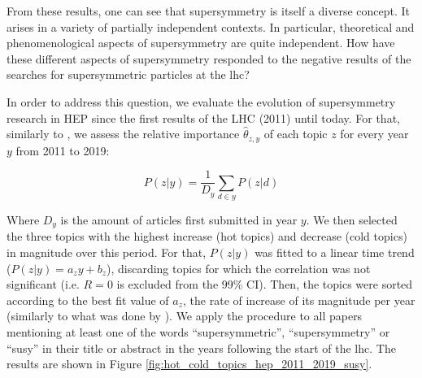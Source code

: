 \documentclass[smallextended]{svjour3}
\begin{document}
From these results, one can see that supersymmetry is itself a diverse concept. It arises in a variety of partially independent contexts. In particular, theoretical and phenomenological aspects of supersymmetry are quite independent. How have these different aspects of supersymmetry responded to the negative results of the searches for supersymmetric particles at the \gls{lhc}?

In order to address this question, we evaluate the evolution of supersymmetry research in HEP since the first results of the LHC (2011) until today. For that, similarly to \citet{Hall2008}, we assess the relative importance $\hat{\theta}_{z,y}$ of each topic $z$ for every year $y$ from 2011 to 2019:

\begin{equation}
P(z|y) = \dfrac{1}{D_y}\sum_{d\in y} P(z|d)   
\end{equation}

Where $D_y$ is the amount of articles first submitted in year $y$. We then selected the three topics with the highest increase (hot topics) and decrease (cold topics) in magnitude over this period. For that, $P(z|y)$ was fitted to a linear time trend ($P(z|y) = a_zy+b_z$), discarding topics for which the correlation was not significant (i.e. $R=0$ is excluded from the 99\% CI). Then, the topics were sorted according to the best fit value of $a_z$, the rate of increase of its magnitude per year (similarly to what was done by \citealt{Griffiths2004}). We apply the procedure to  all papers mentioning at least one of the words ``supersymmetric'', ``supersymmetry'' or ``susy'' in their title or abstract in the years following the start of the \gls{lhc}. The results are shown in Figure  \ref{fig:hot_cold_topics_hep_2011_2019_susy}. 


\begin{figure*}
    \centering
    
    \caption{\textbf{Cold and hot topics among those that mention supersymmetry since the first results of the LHC (2011-2019).} On the left, the three coldest topics are ``Supersymmetric particles'', ``Higgs sector beyond the SM'' and ``Higgs boson''. On the right, the three hottest topics are ``Supergravity'', ``Amplitudes and Feynman Diagrams'', ``Conformal Field Theory''.}
    \label{fig:hot_cold_topics_hep_2011_2019_susy}
\end{figure*}
\end{document}
